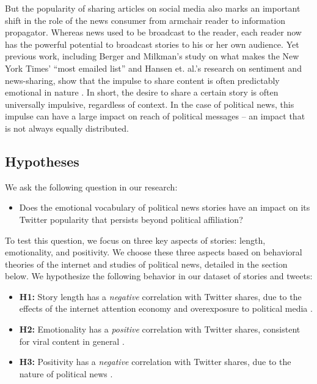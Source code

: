 \documentclass[letterpaper]{article}
\begin{document}
But the popularity of sharing articles on social media also marks an important shift in the role of the news consumer from armchair reader to information propagator. Whereas news used to be broadcast to the reader, each reader now has the powerful potential to broadcast stories to his or her own audience. Yet previous work, including Berger and Milkman's study on what makes the New York Times' ``most emailed list'' and Hansen et. al.'s research on sentiment and news-sharing, show that the impulse to share content is often predictably emotional in nature \cite{berger2012makes, hansen2011good}. In short, the desire to share a certain story is often universally impulsive, regardless of context. In the case of political news, this impulse can have a large impact on reach of political messages -- an impact that is not always equally distributed. 

 \subsection{Hypotheses}
We ask the following question in our research: 

\begin{itemize}
\item Does the emotional vocabulary of political news stories have an impact on its Twitter popularity that persists beyond political affiliation?  
\end{itemize}

To test this question, we focus on three key aspects of stories: length, emotionality, and positivity. We choose these three aspects based on behavioral theories of the internet and studies of political news, detailed in the section below. We hypothesize the following behavior in our dataset of stories and tweets:

\begin{itemize} 
    \item \textbf{H1:} Story length has a \emph{negative} correlation with Twitter shares, due to the effects of the internet attention economy and overexposure to political media \cite{goldhaber1997attention}.
    \item \textbf{H2:} Emotionality has a \emph{positive} correlation with Twitter shares, consistent for viral content in general \cite{berger2012makes}.
    \item \textbf{H3:} Positivity has a \emph{negative} correlation with Twitter shares, due to the nature of political news \cite{berger2012makes, hansen2011good}.

\end{itemize}
\end{document}
